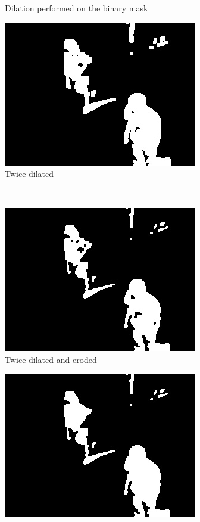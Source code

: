 \documentclass[12pt,a4paper]{report}
\begin{document}
\begin{figure}
\begin{subfigure}{.5\textwidth}
  \caption{Dilation performed on the binary mask}
  \label{fig:sfig3}
\end{subfigure}%
\begin{subfigure}{.5\textwidth}
  \centering
  \includegraphics[width=.8\linewidth]{morphology/dilate2.jpeg}
  \caption{Twice dilated}
  \label{fig:sfig4}
\end{subfigure}\\
\begin{subfigure}{.5\textwidth}
  \centering
  \includegraphics[width=.8\linewidth]{morphology/errode.jpeg}
  \caption{Twice dilated and eroded}
  \label{fig:sfig5}
\end{subfigure}%
\begin{subfigure}{.5\textwidth}
  \centering
  \includegraphics[width=.8\linewidth]{morphology/shape.jpeg}

\end{subfigure}
\end{figure}
\end{document}
